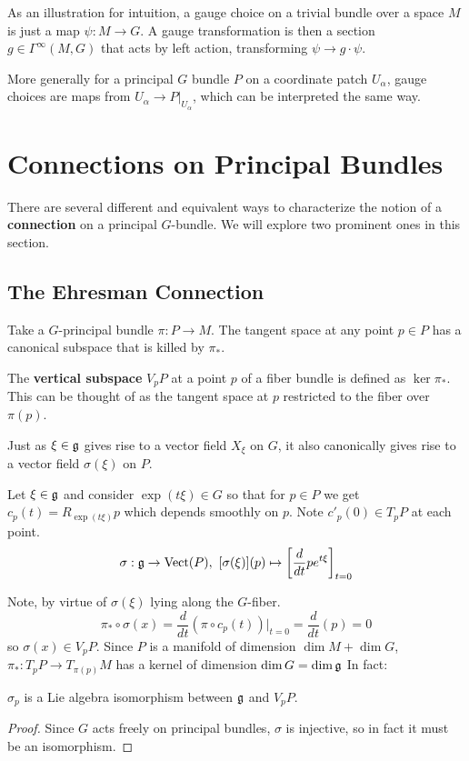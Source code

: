 		As an illustration for intuition, a gauge choice on a trivial bundle over a space $M$ is just a map $\psi: M \to G$. A gauge transformation is then a section $g \in \Gamma^{\infty} (M, G)$ that acts by left action, transforming $\psi \to g \cdot \psi$.
		
		More generally for a principal $G$ bundle $P$ on a coordinate patch $U_\alpha$, gauge choices are maps from $U_\alpha \to P|_{U_\alpha}$, which can be interpreted the same way. 
		
		\section{Connections on Principal Bundles} %
		\label{sec:connections_on_principal_bundles}
		
		There are several different and equivalent ways to characterize the notion of a \textbf{connection} on a principal $G$-bundle. We will explore two prominent ones in this section. 
		
		\subsection{The Ehresman Connection}
		
		
		Take a $G$-principal bundle $\pi: P \rightarrow M$. The tangent space at any point $p \in P$ has a canonical subspace that is killed by $\pi_*$.
		\begin{defn}
			The \textbf{vertical subspace} $V_p P$ at a point $p$ of a fiber bundle is defined as $\ker \pi_*$. This can be thought of as the tangent space at $p$ restricted to the fiber over $\pi(p)$.
		\end{defn}
		
		Just as $\xi \in \frak g$ gives rise to a vector field $X_\xi$ on $G$, it also canonically gives rise to a vector field $\sigma(\xi)$ on $P$.
		\begin{defn}
			Let $\xi \in \frak g$ and consider $\exp(t \xi) \in G$ so that for $p \in P$ we get $c_p(t) = R_{\exp(t \xi)} p$ which depends smoothly on $p$. Note $c'_p(0) \in T_p P$ at each point.
			\[
			\sigma: \frak g \rightarrow \text{Vect}(P), ~ [\sigma(\xi)](p) \mapsto \left[ \frac{d}{dt} p e^{t \xi}\right]_{t=0}
			\]
		\end{defn}
		
		Note, by virtue of $\sigma(\xi)$ lying along the $G$-fiber. 
		\[
		\pi_* \circ \sigma(x) = \frac{d}{dt} (\pi \circ c_p(t))|_{t=0} = \frac{d}{dt} (p) = 0
		\]
		so $\sigma(x) \in V_p P$. 
		Since $P$ is a manifold of dimension $\dim M + \dim G$, $\pi_*: T_pP \rightarrow T_{\pi(p)}M$ has a kernel of dimension $\dim G = \dim \frak g$
		In fact:
		\begin{prop}
			$\sigma_p$ is a Lie algebra isomorphism between $\frak g$ and $V_pP$.
		\end{prop}
		\begin{proof}
		Since $G$ acts freely on principal bundles, $\sigma$ is injective, so in fact it must be an isomorphism.
		\end{proof}
	
